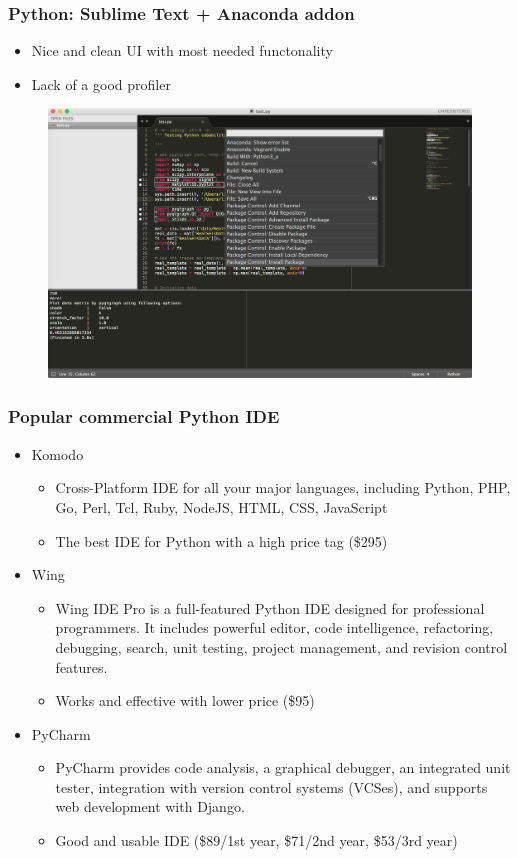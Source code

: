 \documentclass[compress]{beamer}
\begin{document}
\begin{frame}
	\frametitle{Python: Sublime Text + Anaconda addon}
	\begin{itemize}
		\item Nice and clean UI with most needed functonality
		\item Lack of a good profiler
	\end{itemize}
	\begin{figure}
		\centering
		\includegraphics[width=\textwidth]{fig/sublime}
	\end{figure}
\end{frame}

\begin{frame}
	\frametitle{Popular commercial Python IDE}
	\begin{itemize}
		\item Komodo
		\begin{itemize}
			\item Cross-Platform IDE for all your major languages, including Python, PHP, Go, Perl, Tcl, Ruby, NodeJS, HTML, CSS, JavaScript
			\item The best IDE for Python with a high price tag (\$295)
		\end{itemize}
		\item Wing
		\begin{itemize}
			\item Wing IDE Pro is a full-featured Python IDE designed for professional programmers. It includes powerful editor, code intelligence, refactoring, debugging, search, unit testing, project management, and revision control features. 
			\item Works and effective with lower price (\$95)
		\end{itemize}
		\item PyCharm
		\begin{itemize}
			\item PyCharm provides code analysis, a graphical debugger, an integrated unit tester, integration with version control systems (VCSes), and supports web development with Django.
			\item Good and usable IDE (\$89/1st year, \$71/2nd year, \$53/3rd year)
		\end{itemize}
	\end{itemize}
\end{frame}
\end{document}

